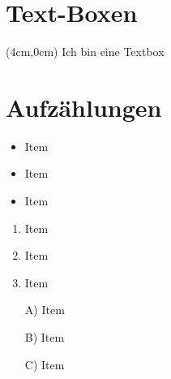 \section{Text-Boxen}
\begin{textblock*}{\textwidth}(4cm,0cm)
  Ich bin eine Textbox
\end{textblock*}


\section{Aufzählungen}
\begin{itemize}[itemsep=0pt]
  \item Item
  \item Item
  \item Item
\end{itemize}

\begin{enumerate}[itemsep=0pt]
  \item Item
  \item Item
  \item Item
\end{enumerate}

\begin{itemize}[itemsep=0pt]
  \item[A)] Item
  \item[B)] Item
  \item[C)] Item
\end{itemize}

\begin{description}[itemsep=0pt]
  \item[Itempoint 1] \mbox{} \\
  \lipsum[1]
  \bigskip

  \item[Itempoint 2] \mbox{} \\
  \lipsum[1]
  \bigskip

  \item[Itempoint 3] \mbox{} \\
  \lipsum[1]
\end{description}

